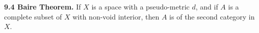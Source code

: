 \textbf{9.4 Baire Theorem.} If $X$ is a space with a pseudo-metric $d$, and if $A$ is a complete subset of $X$ with non-void interior, then $A$ is of the second category in $X$.
